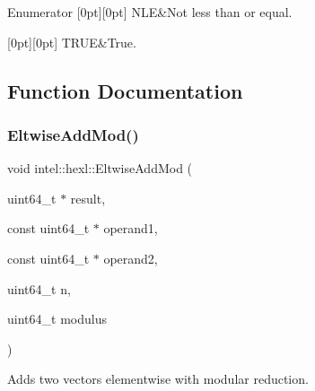 \begin{DoxyEnumFields}{Enumerator}
[0pt][0pt]{}\mbox{\label{namespaceintel_1_1hexl_abdcc9d2d5bb10fa95d5f143874508006aacd748f300c5d189c47807e2a9d6ea57}} 
N\+LE&Not less than or equal. \\
\hline

[0pt][0pt]{}\mbox{\label{namespaceintel_1_1hexl_abdcc9d2d5bb10fa95d5f143874508006ac0d83f0b82a6b30de8811e69e6d95c61}} 
T\+R\+UE&True. \\
\hline

\end{DoxyEnumFields}


\subsection{Function Documentation}
\mbox{\label{namespaceintel_1_1hexl_a319244a133f57825ba7e593ad5c71709}} 
\subsubsection{\texorpdfstring{Eltwise\+Add\+Mod()}{EltwiseAddMod()}\hspace{0.1cm}{\footnotesize\ttfamily [1/2]}}
{\footnotesize\ttfamily void intel\+::hexl\+::\+Eltwise\+Add\+Mod (\begin{DoxyParamCaption}\item[{uint64\+\_\+t $\ast$}]{result,  }\item[{const uint64\+\_\+t $\ast$}]{operand1,  }\item[{const uint64\+\_\+t $\ast$}]{operand2,  }\item[{uint64\+\_\+t}]{n,  }\item[{uint64\+\_\+t}]{modulus }\end{DoxyParamCaption})}



Adds two vectors elementwise with modular reduction. 


